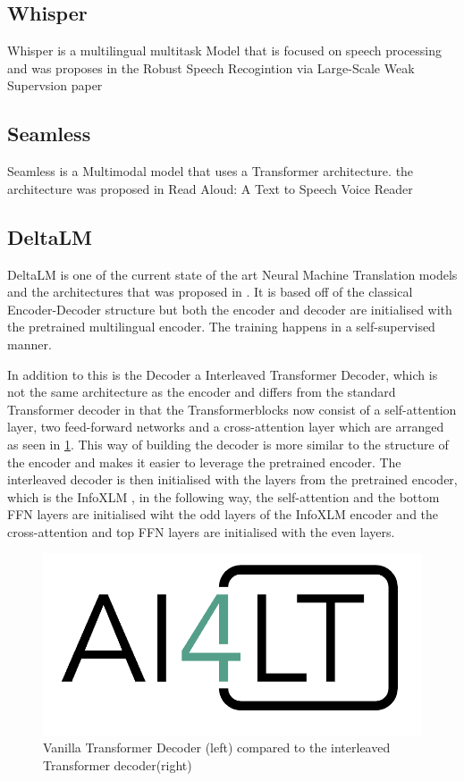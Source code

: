 \subsection{Whisper}
Whisper is a multilingual multitask Model that is focused on speech processing and was proposes in the Robust Speech Recogintion via Large-Scale Weak Supervsion paper \cite{radford2022robust} 
\subsection{Seamless}
Seamless is a Multimodal model that uses a Transformer architecture. 
the architecture was proposed in \cite{seamless2023}Read Aloud: A Text to Speech Voice Reader 

\subsection{DeltaLM}
DeltaLM is one of the current state of the art Neural Machine Translation models and the architectures that was proposed in \cite{ma2021deltalm}. It is based off of the classical Encoder-Decoder structure but both the encoder and decoder are initialised with the pretrained multilingual encoder. The training happens in a self-supervised manner. 

In addition to this is the Decoder a Interleaved Transformer Decoder, which is not the same architecture as the encoder and differs from the standard Transformer decoder in that the Transformerblocks now consist of a self-attention layer, two feed-forward networks and a cross-attention layer which are arranged as seen in \ref{fig:interleaved decoder}. 
This way of building the decoder is more similar to the structure of the encoder and makes it easier to leverage the pretrained encoder. The interleaved decoder is then initialised with the layers from the pretrained encoder, which is the InfoXLM \cite{chi2021infoxlminformationtheoreticframeworkcrosslingual}, in the following way, the self-attention and the bottom FFN layers are initialised wiht the odd layers of the InfoXLM encoder and the cross-attention and top FFN layers are initialised with the even layers. 

\begin{figure}
    \centering
    \includegraphics[width=0.5\linewidth]{Latex/logos/AI4LT_logo.png}
    \caption{Vanilla Transformer Decoder (left) compared to the interleaved Transformer decoder(right)}
    \label{fig:interleaved decoder}
\end{figure}
